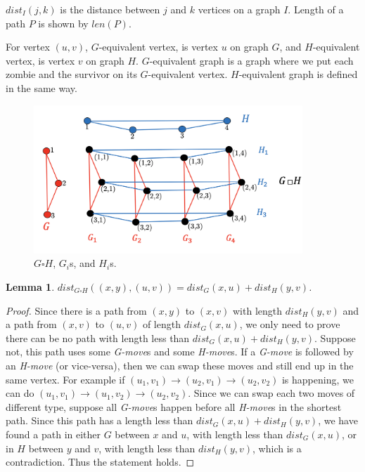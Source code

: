 \documentclass[1p]{elsarticle}
\newtheorem{lemma}[theorem]{Lemma}
\begin{document}
$dist_I(j,k)$ is the distance between $j$ and $k$ vertices on a graph $I$. Length of a path $P$ is shown by $len(P)$. 

For vertex $(u,v)$, $G$-equivalent vertex, is vertex $u$ on graph $G$, and $H$-equivalent vertex, is vertex $v$ on graph
$H$. $G$-equivalent graph is a graph where we put each zombie and the survivor on its $G$-equivalent vertex.
$H$-equivalent graph is defined in the same way.


\begin{figure}[h!]
	
	\centering
	\includegraphics[width=0.9\textwidth]{fig/cp3.png}
	\caption{$G \square H$, $G_i$s, and $H_i$s.}
	\label{fig:p1}
\end{figure}



\begin{lemma} \label{shortestpathlemma}
	$dist_{G \square H}((x,y),(u,v)) = dist_G(x,u) + dist_H(y,v)$.
\end{lemma}
\begin{proof}
	Since there is a path from $(x,y)$ to $(x,v)$ with length $dist_H(y,v)$ and a path from $(x,v)$ to $(u,v)$ of length
	$dist_G(x,u)$, we only need to prove there can be no path with length less than $dist_G(x,u) + dist_H(y,v)$.
	Suppose not, this path uses some {\it G-move}s and some {\it H-move}s. If a {\it G-move} is followed by an {\it
	H-move} (or vice-versa), then we can swap these moves and still end up in the same vertex. For example if $(u_1,v_1)
	\rightarrow (u_2,v_1) \rightarrow (u_2,v_2)$ is happening, we can do $(u_1,v_1) \rightarrow (u_1,v_2) \rightarrow
	(u_2,v_2)$. Since we can swap each two moves of different type, suppose all {\it G-move}s happen before all {\it
	H-move}s in the shortest path. Since this path has a length less than $dist_G(x,u) + dist_H(y,v)$, we have found a
	path in either $G$ between $x$ and $u$, with length less than $dist_G(x,u)$, or in $H$ between $y$ and $v$, with
	length less than $dist_H(y,v)$, which is a contradiction. Thus the statement holds.
\end{proof}
\end{document}
